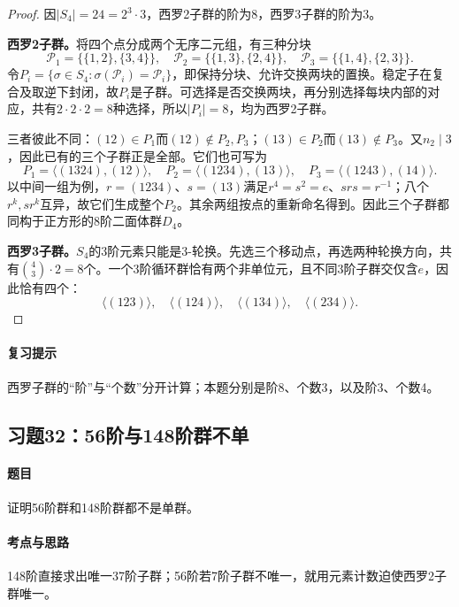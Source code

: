 \documentclass[UTF8,a4paper,11pt,fontset=windows]{ctexart}
\begin{document}
\begin{proof}
因$|S_4|=24=2^3\cdot3$，西罗2子群的阶为8，西罗3子群的阶为3。

\textbf{西罗2子群。}将四个点分成两个无序二元组，有三种分块
\[
\mathcal P_1=\{\{1,2\},\{3,4\}\},\quad
\mathcal P_2=\{\{1,3\},\{2,4\}\},\quad
\mathcal P_3=\{\{1,4\},\{2,3\}\}.
\]
令$P_i=\{\sigma\in S_4:\sigma(\mathcal P_i)=\mathcal P_i\}$，即保持分块、允许交换两块的置换。稳定子在复合及取逆下封闭，故$P_i$是子群。可选择是否交换两块，再分别选择每块内部的对应，共有$2\cdot2\cdot2=8$种选择，所以$|P_i|=8$，均为西罗2子群。

三者彼此不同：$(12)\in P_1$而$(12)\notin P_2,P_3$；$(13)\in P_2$而$(13)\notin P_3$。又$n_2\mid3$，因此已有的三个子群正是全部。它们也可写为
\[
P_1=\langle(1324),(12)\rangle,\quad
P_2=\langle(1234),(13)\rangle,\quad
P_3=\langle(1243),(14)\rangle.
\]
以中间一组为例，$r=(1234)$、$s=(13)$满足$r^4=s^2=e$、$srs=r^{-1}$；八个$r^k,sr^k$互异，故它们生成整个$P_2$。其余两组按点的重新命名得到。因此三个子群都同构于正方形的8阶二面体群$D_4$。

\textbf{西罗3子群。}$S_4$的3阶元素只能是3-轮换。先选三个移动点，再选两种轮换方向，共有$\binom43\cdot2=8$个。一个3阶循环群恰有两个非单位元，且不同3阶子群交仅含$e$，因此恰有四个：
\[
\langle(123)\rangle,\quad\langle(124)\rangle,\quad
\langle(134)\rangle,\quad\langle(234)\rangle.
\]
\end{proof}

\paragraph{复习提示}
西罗子群的“阶”与“个数”分开计算；本题分别是阶8、个数3，以及阶3、个数4。


\subsection{习题32：\texorpdfstring{56阶与148阶群不单}{56阶与148阶群不单}}
\label{ex:2:32}

\paragraph{题目}
证明56阶群和148阶群都不是单群。

\paragraph{考点与思路}
148阶直接求出唯一37阶子群；56阶若7阶子群不唯一，就用元素计数迫使西罗2子群唯一。
\end{document}
